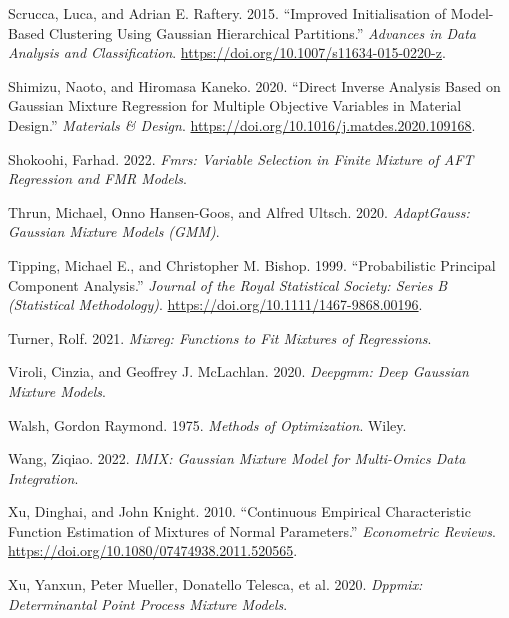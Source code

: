 \begin{CSLReferences}{1}{0}
\leavevmode{}%
Scrucca, Luca, and Adrian E. Raftery. 2015. {``Improved Initialisation of Model-Based Clustering Using {Gaussian} Hierarchical Partitions.''} \emph{Advances in Data Analysis and Classification}. \url{https://doi.org/10.1007/s11634-015-0220-z}.

\leavevmode{}%
Shimizu, Naoto, and Hiromasa Kaneko. 2020. {``Direct Inverse Analysis Based on {Gaussian} Mixture Regression for Multiple Objective Variables in Material Design.''} \emph{Materials \& Design}. \url{https://doi.org/10.1016/j.matdes.2020.109168}.

\leavevmode{}%
Shokoohi, Farhad. 2022. \emph{Fmrs: Variable Selection in Finite Mixture of AFT Regression and FMR Models}.

\leavevmode{}%
Thrun, Michael, Onno Hansen-Goos, and Alfred Ultsch. 2020. \emph{AdaptGauss: Gaussian Mixture Models (GMM)}.

\leavevmode{}%
Tipping, Michael E., and Christopher M. Bishop. 1999. {``Probabilistic {Principal} {Component} {Analysis}.''} \emph{Journal of the Royal Statistical Society: Series B (Statistical Methodology)}. \url{https://doi.org/10.1111/1467-9868.00196}.

\leavevmode{}%
Turner, Rolf. 2021. \emph{Mixreg: Functions to Fit Mixtures of Regressions}.

\leavevmode{}%
Viroli, Cinzia, and Geoffrey J. McLachlan. 2020. \emph{Deepgmm: Deep Gaussian Mixture Models}.

\leavevmode{}%
Walsh, Gordon Raymond. 1975. \emph{Methods of {Optimization}}. Wiley.

\leavevmode{}%
Wang, Ziqiao. 2022. \emph{IMIX: Gaussian Mixture Model for Multi-Omics Data Integration}.

\leavevmode{}%
Xu, Dinghai, and John Knight. 2010. {``Continuous {Empirical Characteristic Function Estimation} of {Mixtures} of {Normal Parameters}.''} \emph{Econometric Reviews}. \url{https://doi.org/10.1080/07474938.2011.520565}.

\leavevmode{}%
Xu, Yanxun, Peter Mueller, Donatello Telesca, et al. 2020. \emph{Dppmix: Determinantal Point Process Mixture Models}.


\end{CSLReferences}
